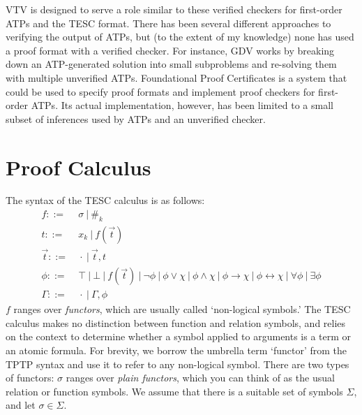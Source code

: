 \documentclass[12pt]{article}
\newcommand{\idf}[1]{\#_{#1}}
\begin{document}
VTV is designed to serve a role similar to these verified checkers for first-order ATPs
and the TESC format.
There has been several different approaches to verifying the output of ATPs, but 
(to the extent of my knowledge) none has used a proof format with a verified checker. 
For instance, GDV \cite{sutcliffe2006semantic} works by breaking down an ATP-generated 
solution into small subproblems and re-solving them with multiple unverified ATPs. 
Foundational Proof Certificates \cite{chihani2013foundational} is a system that could 
be used to specify proof formats and implement proof checkers for first-order ATPs.
Its actual implementation, however, \cite{chihani2015proof} has been limited to a small 
subset of inferences used by ATPs and an unverified checker.



\section{Proof Calculus} \label{set:proof-calc} 

The syntax of the TESC calculus is as follows:
\begin{align*}
f ::= &\ \sigma\ |\ \idf{k}\\
t ::= &\ x_k\ |\ f(\vec{t})\\
\vec{t} ::= &\ \cdot\ |\ \vec{t}, t\\
\phi ::= &\ \top\ |\ \bot\ |\ f(\vec{t})\ |\ \lnot \phi\ |\ \phi \lor \chi\ |\ \phi \land \chi\ |\ \phi \to \chi\ |\ \phi \leftrightarrow \chi\ |\ \forall \phi\ |\ \exists \phi\\
\Gamma ::= &\ \cdot\ |\ \Gamma, \phi
\end{align*}
$f$ ranges over \textit{functors}, which are usually called `non-logical symbols.'
The TESC calculus makes no distinction
between function and relation symbols, and relies on the context to determine whether 
a symbol applied to arguments is a term or an atomic formula. For brevity, we borrow
the umbrella term `functor' from the TPTP syntax and use it to refer to any non-logical symbol.
There are two types of functors: $\sigma$ ranges over \textit{plain functors}, 
which you can think of as the usual relation or function symbols. We assume that there 
is a suitable set of symbols $\Sigma$, and let $\sigma \in \Sigma$.
\end{document}
